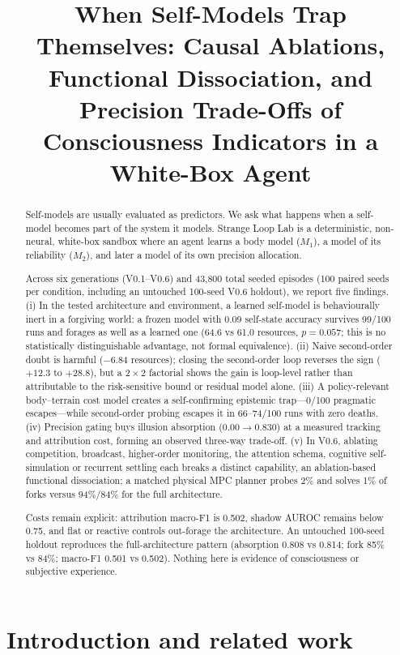 \documentclass{article}
\title{\textbf{When Self-Models Trap Themselves: Causal Ablations, Functional Dissociation, and Precision Trade-Offs of Consciousness Indicators in a White-Box Agent}}
\begin{document}
\maketitle

\begin{abstract}
\noindent
Self-models are usually evaluated as predictors. We ask what happens when a self-model becomes part of the system it models. Strange Loop Lab is a deterministic, non-neural, white-box sandbox where an agent learns a body model ($M_1$), a model of its reliability ($M_2$), and later a model of its own precision allocation.

Across six generations (V0.1--V0.6) and 43{,}800 total seeded episodes (100 paired seeds per condition, including an untouched 100-seed V0.6 holdout), we report five findings. (i) In the tested architecture and environment, a learned self-model is behaviourally inert in a forgiving world: a frozen model with 0.09 self-state accuracy survives 99/100 runs and forages as well as a learned one (64.6 vs 61.0 resources, $p=0.057$; this is no statistically distinguishable advantage, not formal equivalence). (ii) Naive second-order doubt is harmful ($-6.84$ resources); closing the second-order loop reverses the sign ($+12.3$ to $+28.8$), but a $2\times2$ factorial shows the gain is loop-level rather than attributable to the risk-sensitive bound or residual model alone. (iii) A policy-relevant body--terrain cost model creates a self-confirming epistemic trap---0/100 pragmatic escapes---while second-order probing escapes it in 66--74/100 runs with zero deaths. (iv) Precision gating buys illusion absorption ($0.00\rightarrow0.830$) at a measured tracking and attribution cost, forming an observed three-way trade-off. (v) In V0.6, ablating competition, broadcast, higher-order monitoring, the attention schema, cognitive self-simulation or recurrent settling each breaks a distinct capability, an ablation-based functional dissociation; a matched physical MPC planner probes 2\% and solves 1\% of forks versus 94\%/84\% for the full architecture.

Costs remain explicit: attribution macro-F1 is 0.502, shadow AUROC remains below 0.75, and flat or reactive controls out-forage the architecture. An untouched 100-seed holdout reproduces the full-architecture pattern (absorption 0.808 vs 0.814; fork 85\% vs 84\%; macro-F1 0.501 vs 0.502). Nothing here is evidence of consciousness or subjective experience.
\end{abstract}

\section{Introduction and related work}
\end{document}
